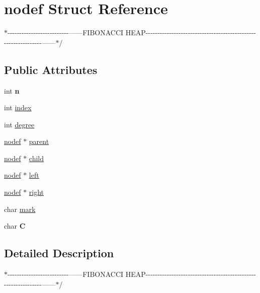 \hypertarget{structnodef}{}\section{nodef Struct Reference}
\label{structnodef}


$\ast$-\/-\/-\/-\/-\/-\/-\/-\/-\/-\/-\/-\/-\/-\/-\/-\/-\/-\/-\/-\/-\/-\/-\/-\/-\/-\/------F\+I\+B\+O\+N\+A\+C\+CI H\+E\+A\+P-\/-\/-\/-\/-\/-\/-\/-\/-\/-\/-\/-\/-\/-\/-\/-\/-\/-\/-\/-\/-\/-\/-\/-\/-\/-\/-\/-\/-\/-\/-\/-\/-\/-\/-\/-\/-\/-\/-\/-\/-\/-\/-\/-\/-\/-\/-\/-\/-\/-\/-\/-\/-\/-\/-\/-\/-\/-\/-\/-\/-\/-\/-\/------$\ast$/  


\subsection*{Public Attributes}
\begin{DoxyCompactItemize}
\item 
int {\bfseries n}\hypertarget{structnodef_a445cba4437e11f5bf779a0b9bd1909a1}{}\label{structnodef_a445cba4437e11f5bf779a0b9bd1909a1}

\item 
int \hyperlink{structnodef_a7d8ce9388f378b24275972f1eaa8d8dd}{index}
\item 
int \hyperlink{structnodef_a0a29ea193cba925e68dbcf3ccc673203}{degree}
\item 
\hyperlink{structnodef}{nodef} $\ast$ \hyperlink{structnodef_aea7c4854fecb939b9a236cfa62dc1db3}{parent}
\item 
\hyperlink{structnodef}{nodef} $\ast$ \hyperlink{structnodef_a03c0d01036bbca579381e8f93df0ad87}{child}
\item 
\hyperlink{structnodef}{nodef} $\ast$ \hyperlink{structnodef_ae257022b5d5765c7cad17fe2af4bd89f}{left}
\item 
\hyperlink{structnodef}{nodef} $\ast$ \hyperlink{structnodef_a4242670aeeda1dc26715fb0f1b63661c}{right}
\item 
char \hyperlink{structnodef_a8a6b8531e0ce2c5ef6d6e1afbcad6440}{mark}
\item 
char {\bfseries C}\hypertarget{structnodef_afa451b49b06f8b28c514d1e7bbaac644}{}\label{structnodef_afa451b49b06f8b28c514d1e7bbaac644}

\end{DoxyCompactItemize}


\subsection{Detailed Description}
$\ast$-\/-\/-\/-\/-\/-\/-\/-\/-\/-\/-\/-\/-\/-\/-\/-\/-\/-\/-\/-\/-\/-\/-\/-\/-\/-\/------F\+I\+B\+O\+N\+A\+C\+CI H\+E\+A\+P-\/-\/-\/-\/-\/-\/-\/-\/-\/-\/-\/-\/-\/-\/-\/-\/-\/-\/-\/-\/-\/-\/-\/-\/-\/-\/-\/-\/-\/-\/-\/-\/-\/-\/-\/-\/-\/-\/-\/-\/-\/-\/-\/-\/-\/-\/-\/-\/-\/-\/-\/-\/-\/-\/-\/-\/-\/-\/-\/-\/-\/-\/-\/------$\ast$/ 

